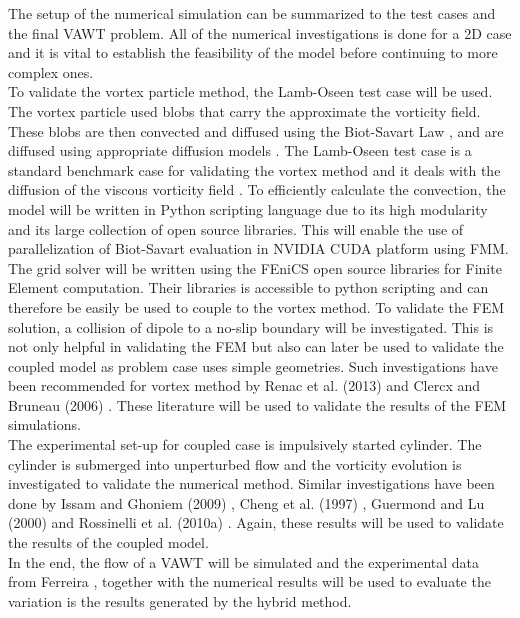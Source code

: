 The setup of the numerical simulation can be summarized to the test cases and the final VAWT problem. All of the numerical investigations is done for a 2D case and it is vital to establish the feasibility of the model before continuing to more complex ones.\\

To validate the vortex particle method, the Lamb-Oseen test case will be used. The vortex particle used blobs that carry the approximate the vorticity field. These blobs are then convected and diffused using the Biot-Savart Law  \cite{Cottet2000a}, and are diffused using appropriate diffusion models \cite{Wee2006}. The Lamb-Oseen test case is a standard benchmark case for validating the vortex method and it deals with the diffusion of the viscous vorticity field \cite{Shankar1996} \cite{Speck2011a} \cite{Barba2004a}. To efficiently calculate the convection, the model will be written in Python scripting language due to its high modularity and its large collection of open source libraries. This will enable the use of parallelization of Biot-Savart evaluation in NVIDIA CUDA platform using FMM.\\ 

The grid solver will be written using the FEniCS open source libraries for Finite Element computation. Their libraries is accessible to python scripting and can therefore be easily be used to couple to the vortex method. To validate the FEM solution, a collision of dipole to a no-slip boundary will be investigated. This is not only helpful in validating the FEM but also can later be used to validate the coupled model as problem case uses simple geometries. Such investigations have been recommended for vortex method by Renac et al. (2013) \cite{Renac2013} and Clercx and Bruneau (2006) \cite{Clercx2006}. These literature will be used to validate the results of the FEM simulations.\\

The experimental set-up for coupled case is impulsively started cylinder. The cylinder is submerged into unperturbed flow and the vorticity evolution is investigated to validate the numerical method. Similar investigations have been done by Issam and Ghoniem (2009) \cite{Lakkis2009}, Cheng et al. (1997) \cite{Cheng1997}, Guermond and Lu (2000) \cite{Guermond2000} and Rossinelli et al. (2010a) \cite{Rossinelli2010a}. Again, these results will be used to validate the results of the coupled model.\\

In the end, the flow of a VAWT will be simulated and the experimental data from Ferreira \cite{Ferreira} \cite{Ferreira2007} \cite{SimaoFerreira2008}, together with the numerical results will be used to evaluate the variation is the results generated by the hybrid method.\\

